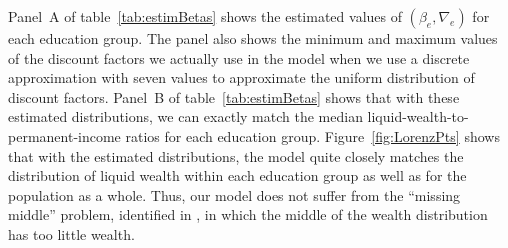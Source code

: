 \documentclass[\econtexRoot/HAFiscal]{subfiles}
\begin{document}
Panel~A of table~\ref{tab:estimBetas} shows the estimated values of $(\beta_e, \nabla_e)$ for each education group.
The panel also shows the minimum and maximum values of the discount factors we actually use in the model when we use a discrete approximation with seven values to approximate the uniform distribution of discount factors.
Panel~B of table~\ref{tab:estimBetas} shows that with these estimated distributions, we can exactly match the median liquid-wealth-to-permanent-income ratios for each education group.
Figure~\ref{fig:LorenzPts} shows that with the estimated distributions, the model quite closely matches the distribution of liquid wealth within each education group as well as for the population as a whole.
Thus, our model does not suffer from the ``missing middle'' problem, identified in \cite{kaplanMPC2022}, in which the middle of the wealth distribution has too little wealth.

\end{document}
